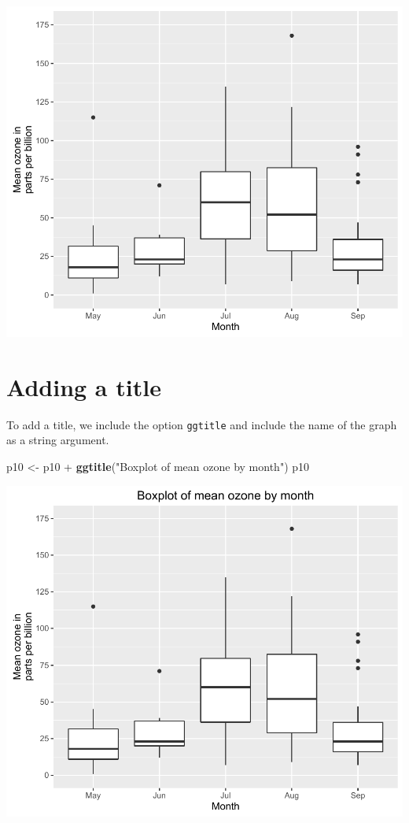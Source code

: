 \documentclass[]{article}
\newenvironment{Shaded}{\begin{snugshade}}{\end{snugshade}}
\newcommand{\KeywordTok}[1]{\textcolor[rgb]{0.13,0.29,0.53}{\textbf{{#1}}}}
\newcommand{\StringTok}[1]{\textcolor[rgb]{0.31,0.60,0.02}{{#1}}}
\newcommand{\NormalTok}[1]{{#1}}
\begin{document}
\begin{center}\includegraphics{10_Boxplots_pdf/box_4-1} \end{center}

\section{Adding a title}\label{adding-a-title}

To add a title, we include the option \texttt{ggtitle} and include the
name of the graph as a string argument.

\begin{Shaded}
\begin{Highlighting}[]
\NormalTok{p10 <-}\StringTok{ }\NormalTok{p10 +}\StringTok{ }\KeywordTok{ggtitle}\NormalTok{(}\StringTok{"Boxplot of mean ozone by month"}\NormalTok{)}
\NormalTok{p10}
\end{Highlighting}
\end{Shaded}

\begin{center}\includegraphics{10_Boxplots_pdf/box_5-1} \end{center}
\end{document}
